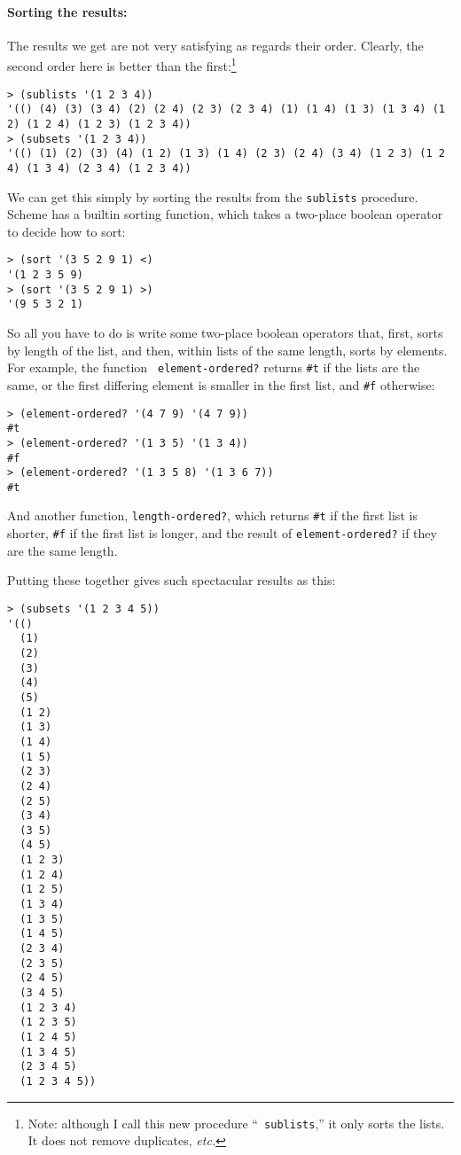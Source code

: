\documentclass{article}
\begin{document}
\paragraph{Sorting the results:}
The results we get are not very satisfying as regards their order.
Clearly, the second order here is better than the
first:\footnote{Note: although I call this new procedure ``{\tt
    sublists},'' it only sorts the lists.  It does not remove
  duplicates, {\em etc.}}
{\small
  \begin{Verbatim}[frame=single]
> (sublists '(1 2 3 4))
'(() (4) (3) (3 4) (2) (2 4) (2 3) (2 3 4) (1) (1 4) (1 3) (1 3 4) (1 2) (1 2 4) (1 2 3) (1 2 3 4))
> (subsets '(1 2 3 4))
'(() (1) (2) (3) (4) (1 2) (1 3) (1 4) (2 3) (2 4) (3 4) (1 2 3) (1 2 4) (1 3 4) (2 3 4) (1 2 3 4))
\end{Verbatim}
}
We can get this simply by sorting the results from the {\tt sublists}
procedure.  Scheme has a builtin sorting function, which takes a
two-place boolean operator to decide how to sort:
\begin{Verbatim}[frame=single]
> (sort '(3 5 2 9 1) <)
'(1 2 3 5 9)
> (sort '(3 5 2 9 1) >)
'(9 5 3 2 1)
\end{Verbatim}
So all you have to do is write some two-place boolean operators that,
first, sorts by length of the list, and then, within lists of the same
length, sorts by elements.  For example, the function {\tt
  element-ordered?} returns \verb|#t| if the lists are the same, or
the first differing element is smaller in the first list, and
\verb|#f| otherwise:
\begin{Verbatim}[frame=single]
> (element-ordered? '(4 7 9) '(4 7 9))
#t
> (element-ordered? '(1 3 5) '(1 3 4))
#f
> (element-ordered? '(1 3 5 8) '(1 3 6 7))
#t
\end{Verbatim}
And another function, {\tt length-ordered?}, which returns \verb|#t|
if the first list is shorter, \verb|#f| if the first list is
longer, and the result of {\tt element-ordered?} if they are the same
length. 

Putting these together gives such spectacular results as this:
{\scriptsize
  \begin{Verbatim}[frame=single]
> (subsets '(1 2 3 4 5))
'(()
  (1)
  (2)
  (3)
  (4)
  (5)
  (1 2)
  (1 3)
  (1 4)
  (1 5)
  (2 3)
  (2 4)
  (2 5)
  (3 4)
  (3 5)
  (4 5)
  (1 2 3)
  (1 2 4)
  (1 2 5)
  (1 3 4)
  (1 3 5)
  (1 4 5)
  (2 3 4)
  (2 3 5)
  (2 4 5)
  (3 4 5)
  (1 2 3 4)
  (1 2 3 5)
  (1 2 4 5)
  (1 3 4 5)
  (2 3 4 5)
  (1 2 3 4 5))
\end{Verbatim}
}
\end{document}
